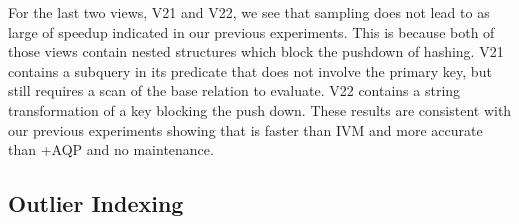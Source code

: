 For the last two views, V21 and V22, we see that sampling does not lead to as large of speedup indicated in our previous experiments.  
This is because both of those views contain nested structures which block the pushdown of hashing.
V21 contains a subquery in its predicate that does not involve the primary key, but still requires a scan of the base relation to evaluate.
V22 contains a string transformation of a key blocking the push down.
These results are consistent with our previous experiments showing that \svc is faster than IVM and more accurate than \svcnospace+AQP and no maintenance.


\subsection{Outlier Indexing}

